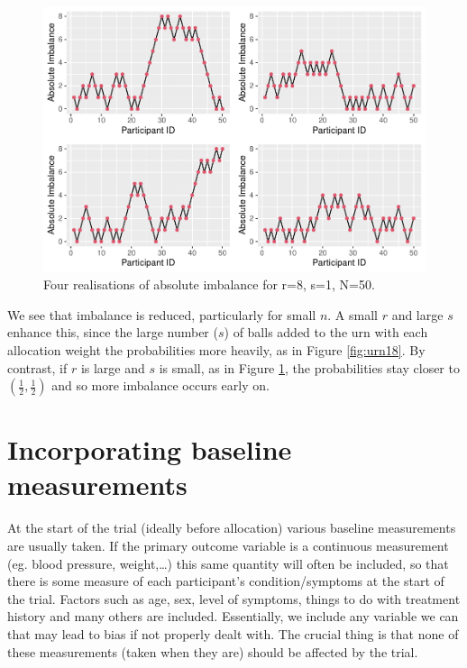 \documentclass[
  openany]{book}
\theoremstyle{definition}
\theoremstyle{definition}
\theoremstyle{definition}
\theoremstyle{definition}
\theoremstyle{remark}
\begin{document}
\begin{figure}
\centering
\includegraphics{CT4H_notes_files/figure-latex/urn81-1.pdf}
\caption{\label{fig:urn81}Four realisations of absolute imbalance for r=8, s=1, N=50.}
\end{figure}

We see that imbalance is reduced, particularly for small \(n\). A small \(r\) and large \(s\) enhance this, since the large number (\(s\)) of balls added to the urn with each allocation weight the probabilities more heavily, as in Figure \ref{fig:urn18}. By contrast, if \(r\) is large and \(s\) is small, as in Figure \ref{fig:urn81}, the probabilities stay closer to \(\left(\frac{1}{2}, \frac{1}{2}\right)\) and so more imbalance occurs early on.

\section{Incorporating baseline measurements}\label{incorporating-baseline-measurements}

At the start of the trial (ideally before allocation) various baseline measurements are usually taken. If the primary outcome variable is a continuous measurement (eg. blood pressure, weight,\ldots) this same quantity will often be included, so that there is some measure of each participant's condition/symptoms at the start of the trial. Factors such as age, sex, level of symptoms, things to do with treatment history and many others are included. Essentially, we include any variable we can that may lead to bias if not properly dealt with. The crucial thing is that none of these measurements (taken when they are) should be affected by the trial.
\end{document}
